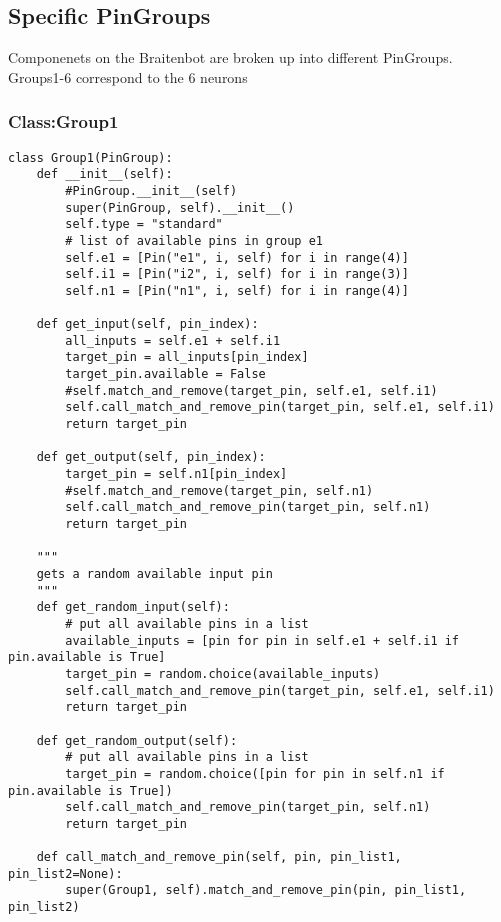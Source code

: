 \documentclass[a4paper]{article}
\begin{document}
\subsection{Specific PinGroups}
\label{sec-4-5}
Componenets on the Braitenbot are broken up into different PinGroups. Groups1-6 correspond to the 6 neurons
\subsubsection{Class:Group1}
\label{sec-4-5-1}
\begin{verbatim}
class Group1(PinGroup):
    def __init__(self):
        #PinGroup.__init__(self)
        super(PinGroup, self).__init__()
        self.type = "standard"
        # list of available pins in group e1
        self.e1 = [Pin("e1", i, self) for i in range(4)]
        self.i1 = [Pin("i2", i, self) for i in range(3)]
        self.n1 = [Pin("n1", i, self) for i in range(4)]

    def get_input(self, pin_index):
        all_inputs = self.e1 + self.i1
        target_pin = all_inputs[pin_index]
        target_pin.available = False
        #self.match_and_remove(target_pin, self.e1, self.i1)
        self.call_match_and_remove_pin(target_pin, self.e1, self.i1)
        return target_pin

    def get_output(self, pin_index):
        target_pin = self.n1[pin_index]
        #self.match_and_remove(target_pin, self.n1)
        self.call_match_and_remove_pin(target_pin, self.n1)
        return target_pin

    """
    gets a random available input pin
    """
    def get_random_input(self):
        # put all available pins in a list
        available_inputs = [pin for pin in self.e1 + self.i1 if pin.available is True]
        target_pin = random.choice(available_inputs)
        self.call_match_and_remove_pin(target_pin, self.e1, self.i1)
        return target_pin

    def get_random_output(self):
        # put all available pins in a list
        target_pin = random.choice([pin for pin in self.n1 if pin.available is True])
        self.call_match_and_remove_pin(target_pin, self.n1)
        return target_pin

    def call_match_and_remove_pin(self, pin, pin_list1, pin_list2=None):
        super(Group1, self).match_and_remove_pin(pin, pin_list1, pin_list2)
\end{verbatim}
\end{document}
